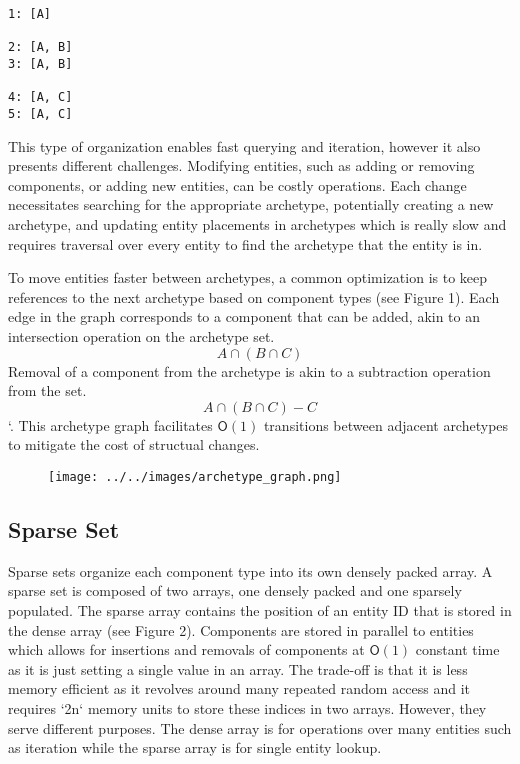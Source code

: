 \documentclass[openany, amssymb, psamsfonts]{amsart}
\theoremstyle{definition}
\numberwithin{equation}{section}
\begin{document}
\begin{verbatim}
1: [A]

2: [A, B]
3: [A, B]

4: [A, C]
5: [A, C]
\end{verbatim}
This type of organization enables fast querying and iteration, however it also presents different challenges. Modifying entities, such as adding or removing components, or adding new entities, can be costly operations. Each change necessitates searching for the appropriate archetype, potentially creating a new archetype, and updating entity placements in archetypes which is really slow and requires traversal over every entity to find the archetype that the entity is in.


To move entities faster between archetypes, a common optimization is to keep 
references to the next archetype based on component types (see Figure 1). 
Each edge in the graph corresponds to a component that can be added, akin to an 
intersection operation on the archetype set. \[A \cap \left( B \cap C \right)\] 
Removal of a component from the archetype is akin to a subtraction operation from the set. \[A \cap \left( B \cap C \right) - {C}\]`. 
This archetype graph facilitates $\mathsf{O}(1)$ transitions between adjacent archetypes to 
mitigate the cost of structual changes.

\begin{figure}[htbp]
\centering
\texttt{[image: ../../images/archetype\_graph.png]}\label{Fig 1: Archetype Graph}
\end{figure}

\subsection{Sparse Set}
Sparse sets organize each component type into its own densely packed array. A sparse set is composed of two arrays, one densely packed and one sparsely populated. The sparse array contains the position of an entity ID that is stored in the dense array (see Figure 2). Components are stored in parallel to entities which allows for insertions and removals of components at $\mathsf{O}(1)$  constant time as it is just setting a single value in an array. The trade-off is that it is less memory efficient as it revolves around many repeated random access and it requires `2n` memory units to store these indices in two arrays. However, they serve different purposes. The dense array is for operations over many entities such as iteration while the sparse array is for single entity lookup. 
\end{document}
